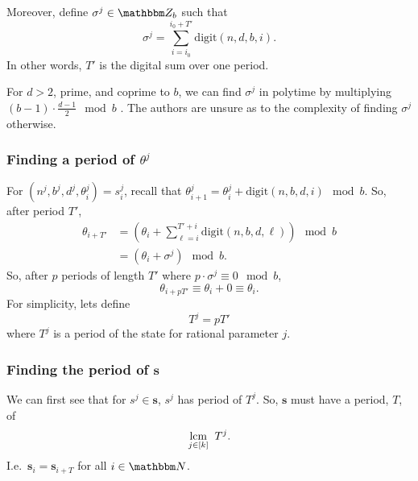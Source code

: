 \documentclass[11pt,titlepage]{article}
\newcommand{\rationalPeriodTotal}{{T}'}
\newcommand{\statePeriod}{T^j}
\newcommand{\rationalAngle}[1]{{\theta^j_{#1}}}
\newcommand{\rationalAngleNotime}{{\theta}^j}
\newcommand{\stateNotime}[1]{s^{#1}}
\newcommand{\totalPeriod}{T}
\newcommand{\digSumPeriodic}{\sigma^j}
\begin{document}
Moreover, define $\digSumPeriodic \in \Z_b$
such that
\begin{equation}
  \digSumPeriodic = \sum_{i = i_0}^{i_0 + \rationalPeriodTotal} \mathrm{digit}(n, d, b, i).
\end{equation}
In other words, $\rationalPeriodTotal$ is the digital sum over one period.

\begin{remark}[Complexity]
\label{remark:digsum-complexity}
  For $d > 2$, prime, and coprime to $b$, we can find $\digSumPeriodic$
  in polytime by multiplying $(b - 1) \cdot \frac{d-1}{2} \mod b$ \cite{OnDecSeq}. The authors are unsure
  as to the complexity of finding $\digSumPeriodic$ otherwise.
\end{remark}

\subsubsection{Finding a period of $\rationalAngleNotime$} %
For $(n^j, b^j, d^j, \theta_i^j) = s_i^j$,
recall that $\rationalAngle{i + 1} = \rationalAngle{i} + \mathrm{digit}(n, b, d, i) \mod b$.
So, after period $\rationalPeriodTotal$,
\begin{align*}
  \theta_{i + \rationalPeriodTotal} &= \left(\theta_{i} + \sum_{\ell = i}^{\rationalPeriodTotal + i} \mathrm{digit}(n, b, d, \ell)\right) \mod b\\
  &= \left(\theta_{i} +  \digSumPeriodic\right) \mod b.
\end{align*}
So, after $p$ periods of length $\rationalPeriodTotal$ where $p  \cdot \digSumPeriodic \equiv 0 \mod b$,
$$
\theta_{i + p\rationalPeriodTotal} \equiv \theta_i + 0 \equiv \theta_i.
$$
For simplicity, lets define
$$
  T^j = p\rationalPeriodTotal
$$
where $T^j$ is a period of the state for rational parameter $j$.

\subsubsection{Finding the period of $\pmb{s}$}
We can first see that for $\stateNotime{j} \in \pmb{s}$, $\stateNotime{j}$
has period of $\statePeriod$. So, $\pmb{s}$ must have a period, $\totalPeriod$, of
$$
\underset{j \in [k]}{\operatorname{lcm}}\;\; T^j.
$$
I.e.\ $\pmb{s}_i = \pmb{s}_{i + T}$ for all $i \in \N$.
\end{document}
